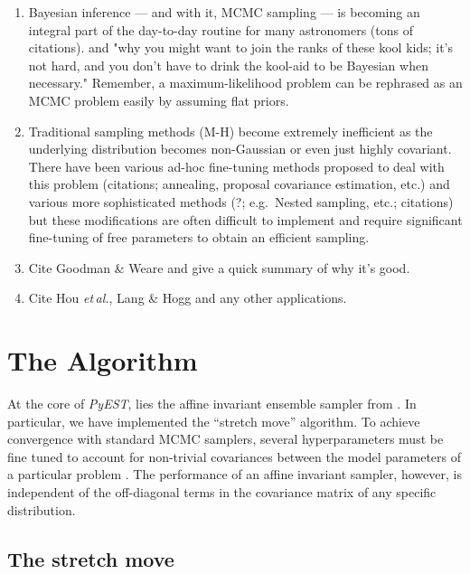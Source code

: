 \documentclass[12pt,preprint]{aastex}
\newcommand{\project}[1]{\textsl{#1}}
\newcommand{\this}{\project{PyEST}}
\newcommand{\foreign}[1]{\emph{#1}}
\newcommand{\etal}{\foreign{et\,al.}}
\begin{document}
\begin{enumerate}

    \item Bayesian inference  --- and with it, MCMC sampling --- is becoming an
        integral part of the day-to-day routine for many astronomers (tons of
        citations). and "why you might want to join the ranks of these kool kids;
        it's not hard, and you don't have to drink the kool-aid to be Bayesian
        when necessary." Remember, a maximum-likelihood problem can be rephrased
        as an MCMC problem easily by assuming flat priors.

    \item Traditional sampling methods (M-H) become extremely inefficient as the
        underlying distribution becomes non-Gaussian or even just highly covariant.
        There have been various ad-hoc fine-tuning methods proposed to deal with
        this problem (citations; annealing, proposal covariance estimation, etc.)
        and various more sophisticated methods (?; e.g.~Nested sampling, etc.;
        citations) but these modifications are often difficult to implement and
        require significant fine-tuning of free parameters to obtain an efficient
        sampling.

    \item Cite Goodman \& Weare and give a quick summary of why it's good.

    \item Cite Hou \etal, Lang \& Hogg and any other applications.

\end{enumerate}

\section{The Algorithm}

\citet{Hou:2011}

At the core of \this, lies the affine invariant ensemble sampler from
\citep{Goodman:2010}.  In particular, we have implemented the ``stretch move''
algorithm.  To achieve convergence with standard MCMC samplers, several
hyperparameters must be fine tuned to account for non-trivial covariances between
the model parameters of a particular problem \citep[e.g.][]{Dunkley:2005}.
The performance of an affine invariant sampler, however, is independent of the
off-diagonal terms in the covariance matrix of any specific distribution.

\subsection{The stretch move}
\end{document}
